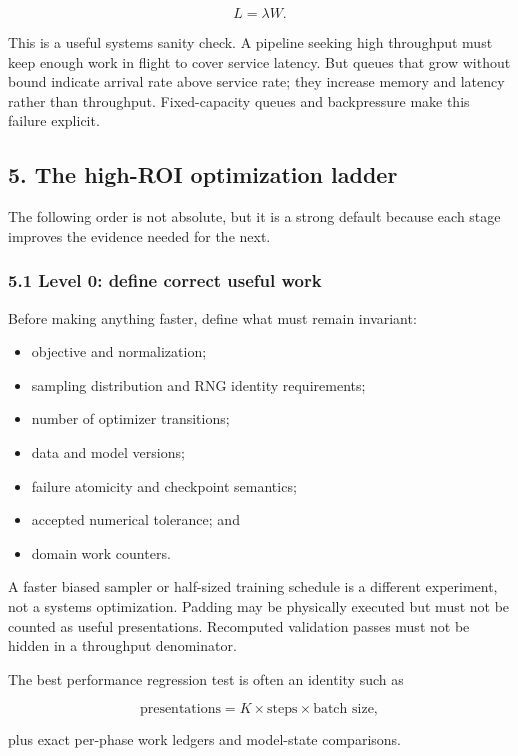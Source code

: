 \documentclass[
  10pt,
  letterpaper,
]{article}
\providecommand{\tightlist}{%
  \setlength{\itemsep}{0pt}\setlength{\parskip}{0pt}}
\begin{document}
\[
L=\lambda W.
\]

This is a useful systems sanity check. A pipeline seeking high
throughput must keep enough work in flight to cover service latency. But
queues that grow without bound indicate arrival rate above service rate;
they increase memory and latency rather than throughput. Fixed-capacity
queues and backpressure make this failure explicit.

\subsection{5. The high-ROI optimization
ladder}\label{5-the-high-roi-optimization-ladder}

The following order is not absolute, but it is a strong default because
each stage improves the evidence needed for the next.

\subsubsection{5.1 Level 0: define correct useful
work}\label{51-level-0-define-correct-useful-work}

Before making anything faster, define what must remain invariant:

\begin{itemize}
\tightlist
\item
  objective and normalization;
\item
  sampling distribution and RNG identity requirements;
\item
  number of optimizer transitions;
\item
  data and model versions;
\item
  failure atomicity and checkpoint semantics;
\item
  accepted numerical tolerance; and
\item
  domain work counters.
\end{itemize}

A faster biased sampler or half-sized training schedule is a different
experiment, not a systems optimization. Padding may be physically
executed but must not be counted as useful presentations. Recomputed
validation passes must not be hidden in a throughput denominator.

The best performance regression test is often an identity such as

\[
\text{presentations}=K\times\text{steps}\times\text{batch size},
\]

plus exact per-phase work ledgers and model-state comparisons.
\end{document}
